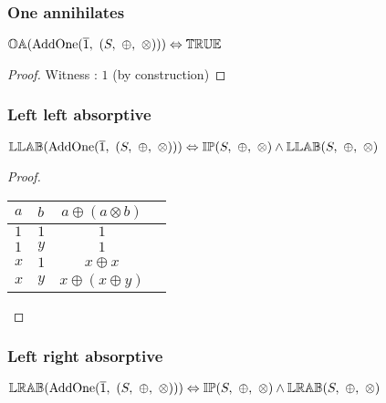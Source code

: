 \documentclass[10pt, ../Summary.tex]{subfiles}
\begin{document}
\subsubsection{One annihilates}

\begin{theorem} \label{thm:addone_one_annihilates}
$\propname{OA}(\mathrm{AddOne}(\overline{1},\ (S,\ \oplus,\ \otimes))) \Leftrightarrow \propname{TRUE} $
\end{theorem}

\begin{proof}

\vspace{0.5em}
Witness : $1$ (by construction)
\end{proof}


\subsubsection{Left left absorptive}

\begin{theorem} \label{thm:addone_left_left_absorptive}
$\propname{LLAB}(\mathrm{AddOne}(\overline{1},\ (S,\ \oplus,\ \otimes))) \Leftrightarrow \propname{IP}(S,\ \oplus,\ \otimes) \wedge \propname{LLAB}(S,\ \oplus,\ \otimes)$
\end{theorem}

\begin{proof}
\begin{center}
\begin{tabular}{llcc}
\toprule
$a$ & $b$ & $a \oplus (a \otimes b)$ \\
\midrule
$1$ & $1$ & $1$ 			\\
$1$ & $y$ & $1$				\\
$x$ & $1$ & $x \oplus x$	\\
$x$ & $y$ & $x \oplus (x \oplus y)$	\\
\bottomrule
\end{tabular}
\end{center}
\end{proof}



\subsubsection{Left right absorptive}

\begin{theorem} \label{thm:addone_left_right_absorptive}
$\propname{LRAB}(\mathrm{AddOne}(\overline{1},\ (S,\ \oplus,\ \otimes))) \Leftrightarrow \propname{IP}(S,\ \oplus,\ \otimes) \wedge \propname{LRAB}(S,\ \oplus,\ \otimes)$
\end{theorem}
\end{document}
